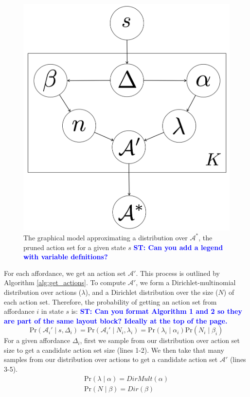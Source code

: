 \documentclass[conference]{IEEEtran}
\newcommand{\stnote}[1]{\textcolor{Blue}{\textbf{ST: #1}}}
\begin{document}
\begin{figure}
\centering
\includegraphics[scale=0.14]{figures/learn_graphical_model.png}%
  \caption{The graphical model approximating a distribution over $\mathcal{A}^*$, the pruned action set for a given state $s$ \stnote{Can you add a legend with variable defnitions?}}
  \label{fig:graphical_model}
\end{figure}

For each affordance, we get an action set $\mathcal{A}'$. This 
process is outlined by Algorithm \ref{alg:get_actions}. To compute $\mathcal{A}'$, we form a Dirichlet-multinomial distribution
over actions ($\lambda$), and a Dirichlet distribution over the size ($N$) of each action set. Therefore, the probability of getting an action set from affordance $i$ in state $s$ is: \stnote{Can you format Algorithm 1 and 2 so they are part of the same layout block?  Ideally at the top of the page.}
\begin{equation}
\text{Pr}(\mathcal{A}_i' \mid s,\Delta_i) = \text{Pr}(\mathcal{A}_i' \mid N_i, \lambda_i) = \text{Pr}(\lambda_i \mid \alpha_i) \text{Pr}(N_i \mid \beta_i)
\end{equation}
For a given affordance $\Delta_i$, first we sample from our distribution over action set size to get a candidate action set size (lines 1-2). We then
take that many samples from our distribution over actions to get a candidate action set $\mathcal{A}'$ (lines 3-5).
\begin{align}
\text{Pr}(\lambda \mid \alpha) = DirMult(\alpha) \\
\text{Pr}(N \mid \beta) = Dir(\beta)
\end{align}
\end{document}
